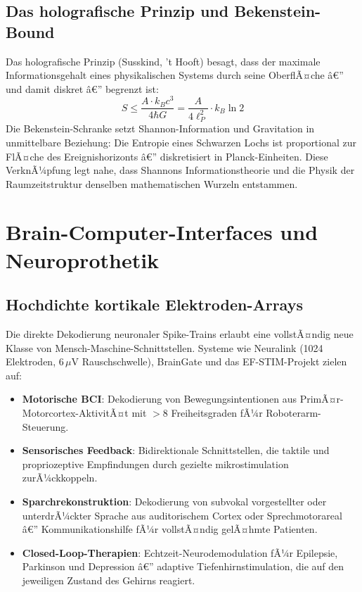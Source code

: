 ﻿\documentclass[12pt,a4paper,titlepage]{report}
\begin{document}
\subsection{Das holografische Prinzip und Bekenstein-Bound}

Das holografische Prinzip (Susskind, 't Hooft) besagt, dass der maximale
Informationsgehalt eines physikalischen Systems durch seine OberflÃ¤che â€”
und damit diskret â€” begrenzt ist:
\[
    S \leq \frac{A \cdot k_B c^3}{4\hbar G} = \frac{A}{4\ell_P^2} \cdot k_B \ln 2
\]
Die Bekenstein-Schranke setzt Shannon-Information und Gravitation in unmittelbare
Beziehung: Die Entropie eines Schwarzen Lochs ist proportional zur FlÃ¤che des
Ereignishorizonts â€” diskretisiert in Planck-Einheiten. Diese VerknÃ¼pfung legt nahe,
dass Shannons Informationstheorie und die Physik der Raumzeitstruktur denselben
mathematischen Wurzeln entstammen.

\section{Brain-Computer-Interfaces und Neuroprothetik}

\subsection{Hochdichte kortikale Elektroden-Arrays}

Die direkte Dekodierung neuronaler Spike-Trains erlaubt eine vollstÃ¤ndig neue Klasse
von Mensch-Maschine-Schnittstellen. Systeme wie Neuralink (1024 Elektroden, $6\,\mu\mathrm{V}$ Rauschschwelle), BrainGate und das EF-STIM-Projekt zielen auf:
\begin{itemize}[leftmargin=2em]
    \item \textbf{Motorische BCI}: Dekodierung von Bewegungsintentionen aus
        PrimÃ¤r-Motorcortex-AktivitÃ¤t mit $> 8$ Freiheitsgraden fÃ¼r Roboterarm-Steuerung.
    \item \textbf{Sensorisches Feedback}: Bidirektionale Schnittstellen, die
        taktile und propriozeptive Empfindungen durch gezielte mikrostimulation zurÃ¼ckkoppeln.
    \item \textbf{Sparchrekonstruktion}: Dekodierung von subvokal vorgestellter
        oder unterdrÃ¼ckter Sprache aus auditorischem Cortex oder Sprechmotorareal â€”
        Kommunikationshilfe fÃ¼r vollstÃ¤ndig gelÃ¤hmte Patienten.
    \item \textbf{Closed-Loop-Therapien}: Echtzeit-Neurodemodulation fÃ¼r
        Epilepsie, Parkinson und Depression â€” adaptive Tiefenhirnstimulation,
        die auf den jeweiligen Zustand des Gehirns reagiert.
\end{itemize}
\end{document}
